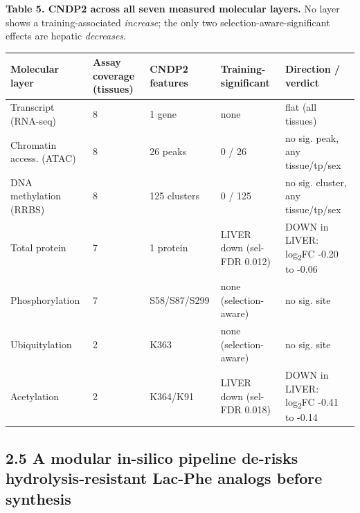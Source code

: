 \documentclass[11pt]{article}
\begin{document}
\textbf{Table 5. CNDP2 across all seven measured molecular layers.} No layer shows a training-associated \textit{increase}; the only two selection-aware-significant effects are hepatic \textit{decreases}.

{\footnotesize
\begin{longtable}{p{3.0cm}llp{2.6cm}p{3.4cm}}
\toprule
\textbf{Molecular layer} & \textbf{Assay coverage (tissues)} & \textbf{CNDP2 features} & \textbf{Training-significant} & \textbf{Direction / verdict} \\
\midrule\endhead
Transcript (RNA-seq) & 8 & 1 gene & none & flat (all tissues) \\
Chromatin access. (ATAC) & 8 & 26 peaks & 0 / 26 & no sig. peak, any tissue/tp/sex \\
DNA methylation (RRBS) & 8 & 125 clusters & 0 / 125 & no sig. cluster, any tissue/tp/sex \\
Total protein & 7 & 1 protein & LIVER down (sel-FDR 0.012) & DOWN in LIVER: log\textsubscript{2}FC -0.20 to -0.06 \\
Phosphorylation & 7 & S58/S87/S299 & none (selection-aware) & no sig. site \\
Ubiquitylation & 2 & K363 & none (selection-aware) & no sig. site \\
Acetylation & 2 & K364/K91 & LIVER down (sel-FDR 0.018) & DOWN in LIVER: log\textsubscript{2}FC -0.41 to -0.14 \\
\bottomrule
\end{longtable}
}



\subsection*{2.5 A modular in-silico pipeline de-risks hydrolysis-resistant Lac-Phe analogs before synthesis}
\end{document}
